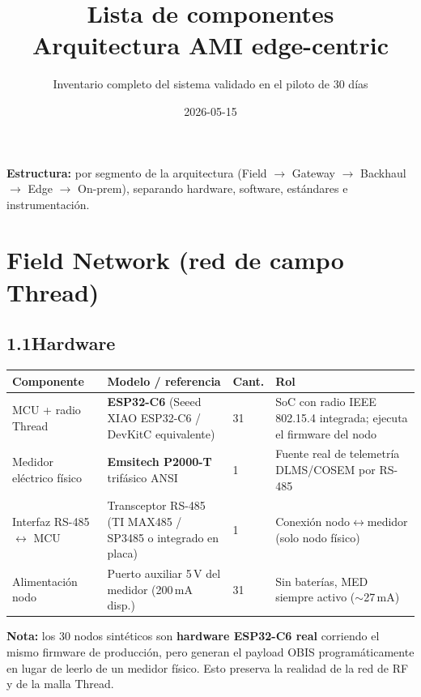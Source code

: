 \documentclass[11pt,a4paper]{article}
\title{\bfseries\color{accentBlue}Lista de componentes\\
       \large\mdseries\color{accentGray}Arquitectura AMI edge-centric}
\author{Inventario completo del sistema validado en el piloto de 30 días}
\date{2026-05-15}
\newcommand{\tabhead}[1]{\textbf{\color{accentBlue!80!black}#1}}
\begin{document}
\maketitle

\begin{notebox}
\textbf{Estructura:} por segmento de la arquitectura
(Field $\rightarrow$ Gateway $\rightarrow$ Backhaul $\rightarrow$ Edge $\rightarrow$ On-prem),
separando hardware, software, estándares e instrumentación.
\end{notebox}

\section{Field Network (red de campo Thread)}

\subsection*{1.1\quad Hardware}
\noindent\begin{tabularx}{\linewidth}{L{3.4cm} Y C{1.2cm} Y}
\toprule
\tabhead{Componente} & \tabhead{Modelo / referencia} & \tabhead{Cant.} & \tabhead{Rol} \\
\midrule
MCU + radio Thread &
\textbf{ESP32-C6} (Seeed XIAO ESP32-C6 / DevKitC equivalente) &
31 & SoC con radio IEEE 802.15.4 integrada; ejecuta el firmware del nodo \\
Medidor eléctrico físico & \textbf{Emsitech P2000-T} trifásico ANSI &
1 & Fuente real de telemetría DLMS/COSEM por RS-485 \\
Interfaz RS-485 $\leftrightarrow$ MCU & Transceptor RS-485 (TI MAX485 / SP3485 o integrado en placa) &
1 & Conexión nodo$\leftrightarrow$medidor (solo nodo físico) \\
Alimentación nodo & Puerto auxiliar 5\,V del medidor (200\,mA disp.) &
31 & Sin baterías, MED siempre activo ($\sim$27\,mA) \\
\bottomrule
\end{tabularx}

\begin{notebox}
\textbf{Nota:} los 30 nodos sintéticos son \textbf{hardware ESP32-C6 real}
corriendo el mismo firmware de producción, pero generan el payload OBIS
programáticamente en lugar de leerlo de un medidor físico. Esto preserva la
realidad de la red de RF y de la malla Thread.
\end{notebox}
\end{document}
